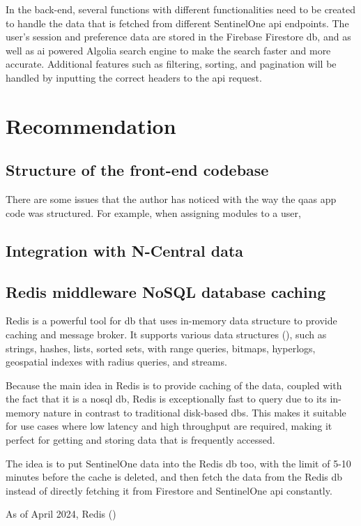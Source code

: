 \begin{multicols}{2}
  In the back-end, several functions with different functionalities need to be created to handle the data that is fetched from different SentinelOne
  \acrshort{api} endpoints. The user's session and preference data are stored in the Firebase Firestore \acrshort{db}, and as well as \acrshort{ai} powered
  Algolia search engine to make the search faster and more accurate. Additional features such as filtering, sorting, and pagination will be handled by
  inputting the correct headers to the \acrshort{api} request.

  \section{Recommendation}

  \subsection{Structure of the front-end codebase}

  There are some issues that the author has noticed with the way the \acrshort{qaas} app code was structured. For example, when
  assigning modules to a user,


  \subsection{Integration with N-Central data}

  \subsection{Redis middleware NoSQL database caching}
  Redis is a powerful tool for \acrshort{db} that uses in-memory data structure to provide caching and message broker. It supports various
  data structures (\textit{\cite{redisDataStructure}}), such as strings, hashes, lists, sorted sets, with range queries, bitmaps, hyperlogs,
  geospatial indexes with radius queries, and streams.

  Because the main idea in Redis is to provide caching of the data, coupled with the fact that it is a \acrshort{nosql} \acrshort{db},
  Redis is exceptionally fast to query due to its in-memory nature in contrast to traditional disk-based \acrshort{db}s. This makes it
  suitable for use cases where low latency and high throughput are required, making it perfect for getting and storing data that is frequently
  accessed.

  The idea is to put SentinelOne data into the Redis \acrshort{db} too, with the limit of 5-10 minutes before the cache is deleted, and then fetch
  the data from the Redis \acrshort{db} instead of directly fetching it from Firestore and SentinelOne \acrshort{api} constantly.

  As of April 2024, Redis (\textit{\cite{redisIsNoLongerFree}})



\end{multicols}


